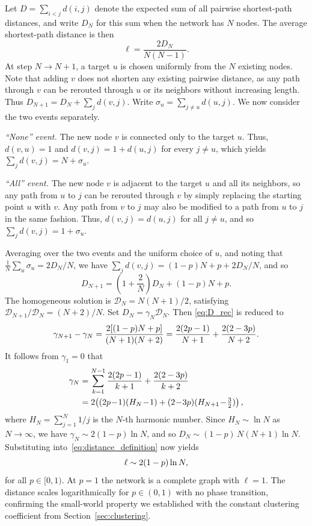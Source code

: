 \documentclass[aps,pre,twocolumn,showpacs,preprintnumbers]{revtex4-2}
\begin{document}
Let $D = \sum_{i<j}d(i,j)$ denote the expected sum of all pairwise shortest-path distances, and write $D_N$ for this sum when the network has $N$ nodes. The average shortest-path distance is then
\begin{equation}\label{eq:distance_definition}
  \ell = \frac{2D_N}{N(N-1)}.
\end{equation}
At step $N\to N+1$, a target $u$ is chosen uniformly from the $N$ existing nodes. Note that adding $v$ does not shorten any existing pairwise distance, as any path through $v$ can be rerouted through $u$ or its neighbors without increasing length. Thus $D_{N+1} = D_N + \sum_{j}d(v,j)$. Write $\sigma_u = \sum_{j\neq u}d(u,j)$. We now consider the two events separately.

\emph{``None'' event.} The new node $v$ is connected only to the target $u$. Thus, $d(v,u)=1$ and $d(v,j)=1+d(u,j)$ for every $j\neq u$, which yields $\sum_{j}d(v,j) = N + \sigma_u$.

\emph{``All'' event.} The new node $v$ is adjacent to the target $u$ and all its neighbors, so any path from $u$ to $j$ can be rerouted through $v$ by simply replacing the starting point $u$ with $v$. Any path from $v$ to $j$ may also be modified to a path from $u$ to $j$ in the same fashion. Thus, $d(v,j) = d(u,j)$ for all $j \neq u$, and so $\sum_{j}d(v,j) = 1 + \sigma_u$. 

Averaging over the two events and the uniform choice of $u$, and noting that $\frac{1}{N}\sum_u\sigma_u = 2D_N/N$, we have $\sum_{j}d(v,j) = (1 - p)N + p + 2D_N/N$, and so
\begin{equation}\label{eq:D_rec}
  D_{N+1} = \left(1+\frac{2}{N}\right)D_N + (1-p)N + p.
\end{equation}
The homogeneous solution is $\mathcal{D}_N = N(N+1)/2$, satisfying $\mathcal{D}_{N+1}/\mathcal{D}_N = (N+2)/N$. Set $D_N=\gamma_N \mathcal{D}_N$. Then \eqref{eq:D_rec} is reduced to
\begin{equation}
  \gamma_{N+1}-\gamma_N = \frac{2[(1-p)N+p]}{(N+1)(N+2)} = \frac{2(2p-1)}{N+1}+\frac{2(2-3p)}{N+2}. \notag
\end{equation}
It follows from $\gamma_1 = 0$ that
\begin{align} \label{eq:gamma}
  \gamma_N
  &= \sum_{k = 1}^{N - 1} \frac{2(2p-1)}{k+1}+\frac{2(2-3p)}{k+2} \notag \\
  &= 2\!\left( (2p\!-\!1)(H_N\!-\!1) + (2\!-\!3p)(H_{N+1}\!-\!\tfrac{3}{2}) \right),
\end{align}
where $H_N=\sum_{j=1}^{N}1/j$ is the $N$-th harmonic number. Since $H_N\sim\ln N$ as $N \to \infty$, we have $\gamma_N\sim 2(1-p)\ln N$, and so $D_N\sim(1-p)\,N(N+1)\ln N$. Substituting into~\eqref{eq:distance_definition} now yields
\begin{equation}
  \ell \sim 2(1-p)\ln N, \notag
\end{equation}
for all $p\in[0,1)$. At $p=1$ the network is a complete graph with $\ell=1$. The distance scales logarithmically for $p \in (0, 1)$ with no phase transition, confirming the small-world property we established with the constant clustering coefficient from Section~\ref{sec:clustering}.
\end{document}

